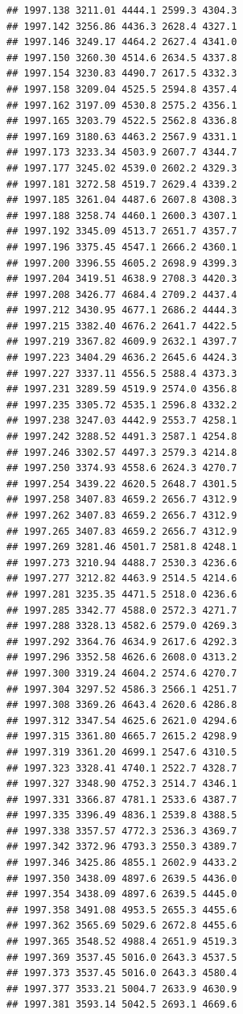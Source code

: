 \documentclass[
]{book}
\begin{document}
\begin{verbatim}
## 1997.138 3211.01 4444.1 2599.3 4304.3
## 1997.142 3256.86 4436.3 2628.4 4327.1
## 1997.146 3249.17 4464.2 2627.4 4341.0
## 1997.150 3260.30 4514.6 2634.5 4337.8
## 1997.154 3230.83 4490.7 2617.5 4332.3
## 1997.158 3209.04 4525.5 2594.8 4357.4
## 1997.162 3197.09 4530.8 2575.2 4356.1
## 1997.165 3203.79 4522.5 2562.8 4336.8
## 1997.169 3180.63 4463.2 2567.9 4331.1
## 1997.173 3233.34 4503.9 2607.7 4344.7
## 1997.177 3245.02 4539.0 2602.2 4329.3
## 1997.181 3272.58 4519.7 2629.4 4339.2
## 1997.185 3261.04 4487.6 2607.8 4308.3
## 1997.188 3258.74 4460.1 2600.3 4307.1
## 1997.192 3345.09 4513.7 2651.7 4357.7
## 1997.196 3375.45 4547.1 2666.2 4360.1
## 1997.200 3396.55 4605.2 2698.9 4399.3
## 1997.204 3419.51 4638.9 2708.3 4420.3
## 1997.208 3426.77 4684.4 2709.2 4437.4
## 1997.212 3430.95 4677.1 2686.2 4444.3
## 1997.215 3382.40 4676.2 2641.7 4422.5
## 1997.219 3367.82 4609.9 2632.1 4397.7
## 1997.223 3404.29 4636.2 2645.6 4424.3
## 1997.227 3337.11 4556.5 2588.4 4373.3
## 1997.231 3289.59 4519.9 2574.0 4356.8
## 1997.235 3305.72 4535.1 2596.8 4332.2
## 1997.238 3247.03 4442.9 2553.7 4258.1
## 1997.242 3288.52 4491.3 2587.1 4254.8
## 1997.246 3302.57 4497.3 2579.3 4214.8
## 1997.250 3374.93 4558.6 2624.3 4270.7
## 1997.254 3439.22 4620.5 2648.7 4301.5
## 1997.258 3407.83 4659.2 2656.7 4312.9
## 1997.262 3407.83 4659.2 2656.7 4312.9
## 1997.265 3407.83 4659.2 2656.7 4312.9
## 1997.269 3281.46 4501.7 2581.8 4248.1
## 1997.273 3210.94 4488.7 2530.3 4236.6
## 1997.277 3212.82 4463.9 2514.5 4214.6
## 1997.281 3235.35 4471.5 2518.0 4236.6
## 1997.285 3342.77 4588.0 2572.3 4271.7
## 1997.288 3328.13 4582.6 2579.0 4269.3
## 1997.292 3364.76 4634.9 2617.6 4292.3
## 1997.296 3352.58 4626.6 2608.0 4313.2
## 1997.300 3319.24 4604.2 2574.6 4270.7
## 1997.304 3297.52 4586.3 2566.1 4251.7
## 1997.308 3369.26 4643.4 2620.6 4286.8
## 1997.312 3347.54 4625.6 2621.0 4294.6
## 1997.315 3361.80 4665.7 2615.2 4298.9
## 1997.319 3361.20 4699.1 2547.6 4310.5
## 1997.323 3328.41 4740.1 2522.7 4328.7
## 1997.327 3348.90 4752.3 2514.7 4346.1
## 1997.331 3366.87 4781.1 2533.6 4387.7
## 1997.335 3396.49 4836.1 2539.8 4388.5
## 1997.338 3357.57 4772.3 2536.3 4369.7
## 1997.342 3372.96 4793.3 2550.3 4389.7
## 1997.346 3425.86 4855.1 2602.9 4433.2
## 1997.350 3438.09 4897.6 2639.5 4436.0
## 1997.354 3438.09 4897.6 2639.5 4445.0
## 1997.358 3491.08 4953.5 2655.3 4455.6
## 1997.362 3565.69 5029.6 2672.8 4455.6
## 1997.365 3548.52 4988.4 2651.9 4519.3
## 1997.369 3537.45 5016.0 2643.3 4537.5
## 1997.373 3537.45 5016.0 2643.3 4580.4
## 1997.377 3533.21 5004.7 2633.9 4630.9
## 1997.381 3593.14 5042.5 2693.1 4669.6

\end{verbatim}
\end{document}
